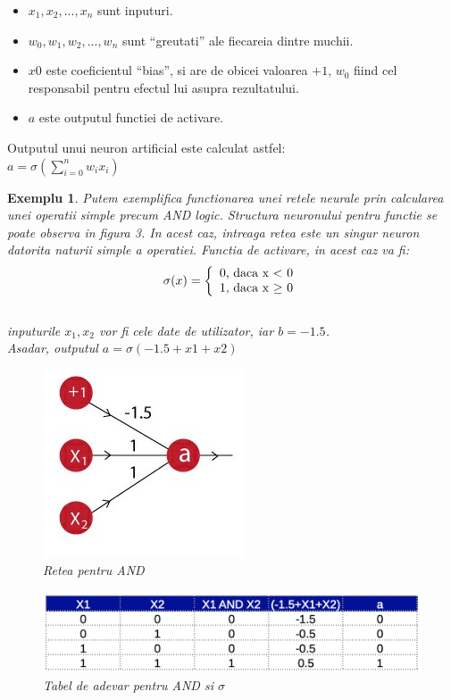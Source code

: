 \documentclass{article}
\newtheorem{example}{Exemplu}[section]
\begin{document}
\begin{itemize}
	\item $x_1, x_2, ..., x_n$ sunt inputuri. \\
	\item $w_0, w_1, w_2, ..., w_n$ sunt ``greutati'' ale fiecareia dintre muchii. \\
	\item $x0$ este coeficientul  ``bias'', si are de obicei valoarea $+1$, $w_0$ fiind cel responsabil pentru efectul lui asupra rezultatului.\\
	\item $a$ este outputul functiei de activare.\\
\end{itemize}

Outputul unui neuron artificial este calculat astfel:\\
$a = \sigma(\sum_{i=0}^n w_i x_i)$

\begin{example}
Putem exemplifica functionarea unei retele neurale prin calcularea unei operatii simple precum AND logic. Structura neuronului pentru functie se poate observa in figura 3. In acest caz, intreaga retea este un singur neuron datorita naturii simple a operatiei. Functia de activare, in acest caz va fi:\\
\[
	\sigma(x)= \left\{
	\begin{array}{ll}
	$0, daca  x $<$ 0$\\
	$1, daca x $\geq$ 0$
	\end{array}
	\right.
\]\\
inputurile $x_1, x_2$ vor fi cele date de utilizator, iar $b = -1.5$.\\
Asadar, outputul $a = \sigma(-1.5+x1+x2)$

\begin{figure}[H]
	\includegraphics[scale=0.5]{and_s}
	\caption{Retea pentru AND \cite{Deep_Learning}}
\end{figure}

\begin{figure}[H]
	\includegraphics[scale=0.5]{and_table}
	\caption{Tabel de adevar pentru AND si $\sigma$ \cite{Deep_Learning}}
\end{figure}

\end{example}
\end{document}
